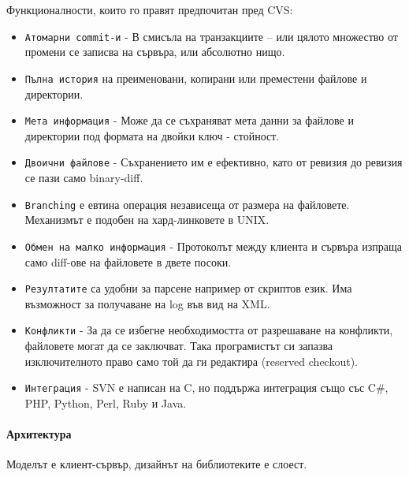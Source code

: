 \documentclass[a4paper]{article}
\begin{document}
    Функционалности, които го правят предпочитан пред CVS:
    \begin{itemize}
      \item \texttt{Атомарни commit-и} - В смисъла на транзакциите -- или цялото множество от промени се записва на сървъра, или абсолютно нищо.
      \item \texttt{Пълна история} на преименовани, копирани или преместени файлове и директории.
      \item \texttt{Мета информация} - Може да се съхраняват мета данни за файлове и директории под формата на двойки ключ - стойност.
      \item \texttt{Двоични файлове} - Съхранението им е ефективно, като от ревизия до ревизия се пази само binary-diff.
      \item \texttt{Branching} е евтина операция независеща от размера на файловете. Механизмът е подобен на хард-линковете в UNIX.
      \item \texttt{Обмен на малко информация} - Протоколът между клиента и сървъра изпраща само diff-ове на файловете в двете посоки.
      \item \texttt{Резултатите} са удобни за парсене например от скриптов език. Има възможност за получаване на log във вид на XML.
      \item \texttt{Конфликти} - За да се избегне необходимостта от разрешаване на конфликти, файловете могат да се заключват. Така програмистът си запазва изключителното право само той да ги редактира (reserved checkout).
      \item \texttt{Интеграция} - SVN е написан на C, но поддържа интеграция също със C\#, PHP, Python, Perl, Ruby и Java.
    \end{itemize}

    \paragraph{Архитектура}
    Моделът е клиент-сървър, дизайнът на библиотеките е слоест.
\end{document}
